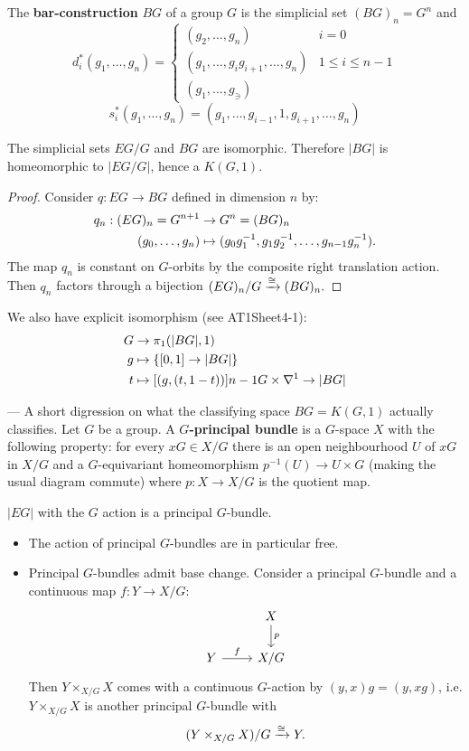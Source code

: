 \begin{remark}
The \textbf{bar-construction} $BG$ of a group $G$ is the simplicial set $(BG)_n=G^n$ and
\[d^*_i(g_1,\dots,g_n)=\begin{cases}
(g_2,\dots,g_n) & i=0\\
(g_1,\dots,g_ig_{i+1},\dots,g_n) & 1\leq i\leq n-1\\
(g_1,\dots,g_\ni)
\end{cases}\]
\[s^*_i(g_1,\dots,g_n)=(g_1,\dots,g_{i-1},1,g_{i+1},\dots,g_n)\]

\begin{lemma}
The simplicial sets $EG/G$ and $BG$ are isomorphic. Therefore $|BG|$ is homeomorphic to $|EG/G|$, hence a $K(G,1)$.
\end{lemma}

\begin{proof}
Consider $q:EG\to BG$ defined in dimension $n$ by:
\begin{align*}
    q_n:(EG)_n=G^{n+1}&\to G^n=(BG)_n\\
    ({{g}_0,\dots,{g}_{n}})&\mapsto(g_0g_1^{-1},g_1g_2^{-1},\dots,g_{n-1} g_n^{-1}).
\end{align*}
The map $q_n$ is constant on $G$-orbits by the composite right translation action. Then $q_n$ factors through a bijection $(EG)_n/G\xrightarrow{\cong}(BG)_n.$
\end{proof}
\end{remark}

We also have explicit isomorphism (see AT1Sheet4-1):
\begin{align*}
    G&\to\pi_1(|BG|,1)\\
    g&\mapsto\cb{[0,1]\to|BG|}\\
    t&\mapsto[(g,(t,1-t))]\cont G\times\sx{1}\to|BG|
\end{align*}

 --- A short digression on what the classifying space $BG=K(G,1)$ actually classifies. Let $G$ be a group. A \textbf{$G$-principal bundle} is a $G$-space $X$ with the following property: for every $xG\in X/G$ there is an open neighbourhood $U$ of $xG$ in $X/G$ and a $G$-equivariant homeomorphism $p^{-1}(U)\to U\times G$ (making the usual diagram commute) where $p:X\to X/G$ is the quotient map.

\begin{example}
$|EG|$ with the $G$ action is a principal $G$-bundle.
\end{example}

\begin{itemize}[label={-}]
    \item The action of principal $G$-bundles are in particular free.
    \item Principal $G$-bundles admit base change. Consider a principal $G$-bundle and a continuous map $f:Y\to X/G$:
    \[\begin{tikzcd} & X \ar[d,"p"] \\
    Y \ar[r,"f"] & X/G\end{tikzcd}\]
    Then $Y\times_{X/G}X$ comes with a continuous $G$-action by $(y,x)g=(y,xg)$, i.e. $Y\times_{X/G}X$ is another principal $G$-bundle with \[(Y\times_{X/G}X)/G\xrightarrow{\cong} Y.\]
\end{itemize}

